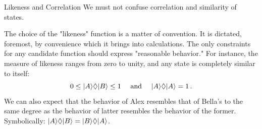 \begin{myrem}{Likeness and Correlation}
	We must not confuse correlation and similarity of states.
\end{myrem}

The choice of the "likeness" function is a matter of convention. It is dictated, foremost, by convenience which it brings into calculations. The only constraints for any candidate function should express "reasonable behavior." For instance, the measure of likeness ranges from zero to unity, and any state is completely similar to itself:
\[
	0 \le |{A}\rangle\lozenge|{B}\rangle\le 1\quad\textrm{ and }\quad |{A}\rangle\lozenge|{A}\rangle=1\,.
\]
We can also expect that the behavior of Alex resembles that of Bella's to the same degree as the behavior of latter resembles the behavior of the former. Symbolically: $|{A}\rangle\lozenge|{B}\rangle=|{B}\rangle\lozenge|{A}\rangle$. 

